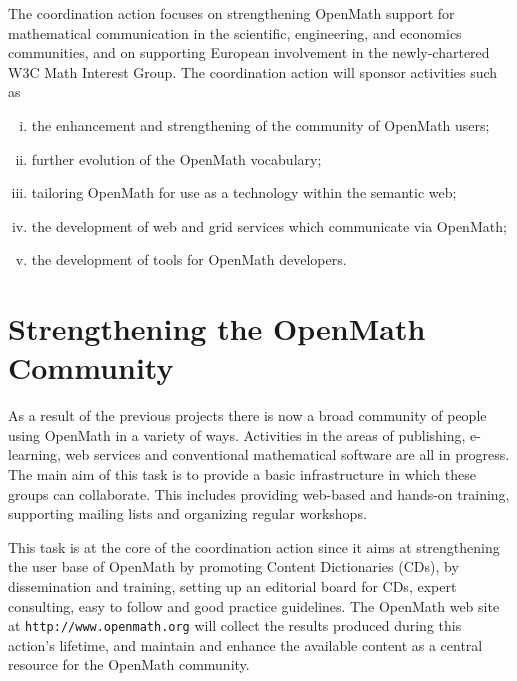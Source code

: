\documentclass[draft]{artikel3}
\begin{document}
The coordination action focuses on strengthening OpenMath support for
mathematical communication in the scientific, engineering, and
economics communities, and on supporting European involvement in the
newly-chartered W3C Math Interest Group.  The coordination action will
sponsor activities such as

\begin{enumerate}[(i)]
\item the enhancement and strengthening of the community of OpenMath
  users;
\item further evolution of the OpenMath vocabulary;
\item tailoring OpenMath for use as a technology within the semantic
  web;
\item the development of web and grid services which communicate via
  OpenMath;
\item the development of tools for OpenMath developers.
\end{enumerate}


\section{Strengthening the OpenMath Community} 
\label{community}


As a result of the previous projects there is now a broad community of
people using OpenMath in a variety of ways.  Activities in the areas
of publishing, e-learning, web services and conventional mathematical
software are all in progress.  The main aim of this task is to provide
a basic infrastructure in which these groups can collaborate. This
includes providing web-based and hands-on training, supporting mailing
lists and organizing regular workshops.

This task is at the core of the coordination action since it aims at
strengthening the user base of OpenMath by promoting Content
Dictionaries (CDs), by dissemination and training, setting up an editorial
board for CDs, expert consulting, easy to follow and good practice
guidelines. The OpenMath web site at \texttt{http://www.openmath.org}
will collect the results produced during this action's lifetime, and
maintain and enhance the available content as a central resource for
the OpenMath community. 


\end{document}
